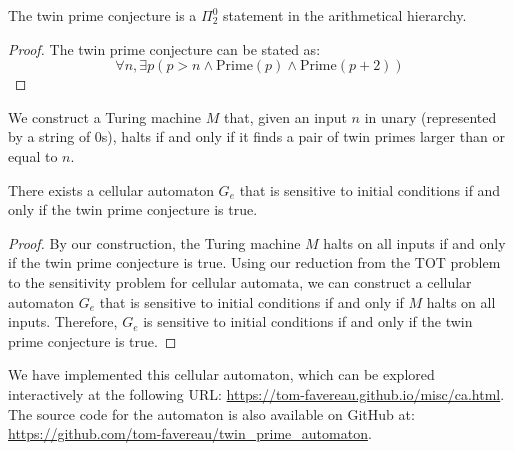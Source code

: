 \documentclass{llncs}
\begin{document}
\begin{proposition}
The twin prime conjecture is a $\Pi^0_2$ statement in the arithmetical hierarchy.
\end{proposition}

\begin{proof}
The twin prime conjecture can be stated as:
\begin{equation}
\forall n, \exists p (p > n \land \text{Prime}(p) \land \text{Prime}(p+2))
\end{equation}
\end{proof}


We construct a Turing machine $M$ that, given an input $n$ in unary (represented by a string of 0s), halts if and only if it finds a pair of twin primes larger than or equal to $n$.







\begin{theorem}
There exists a cellular automaton $G_e$ that is sensitive to initial conditions if and only if the twin prime conjecture is true.
\end{theorem}

\begin{proof}
By our construction, the Turing machine $M$ halts on all inputs if and only if the twin prime conjecture is true. Using our reduction from the TOT problem to the sensitivity problem for cellular automata, we can construct a cellular automaton $G_e$ that is sensitive to initial conditions if and only if $M$ halts on all inputs. Therefore, $G_e$ is sensitive to initial conditions if and only if the twin prime conjecture is true.
\end{proof}

We have implemented this cellular automaton, which can be explored interactively at the following URL: \url{https://tom-favereau.github.io/misc/ca.html}. The source code for the automaton is also available on GitHub at: \\
\url{https://github.com/tom-favereau/twin_prime_automaton}.
\end{document}
